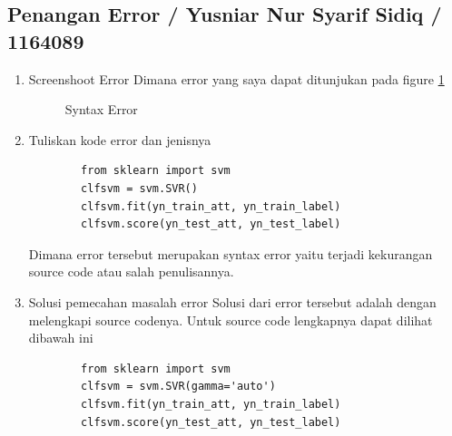 \subsection{Penangan Error / Yusniar Nur Syarif Sidiq / 1164089}
\begin{enumerate}

\item Screenshoot Error
Dimana error yang saya dapat ditunjukan pada figure \ref{YNC4-27}

	\begin{figure}[ht]
		\caption{Syntax Error}
		\label{YNC4-27}
	\end{figure}

\item Tuliskan kode error dan jenisnya

	\begin{verbatim}
		from sklearn import svm
		clfsvm = svm.SVR()
		clfsvm.fit(yn_train_att, yn_train_label)
		clfsvm.score(yn_test_att, yn_test_label)
	\end{verbatim}

Dimana error tersebut merupakan syntax error yaitu terjadi kekurangan source code atau salah penulisannya.

\item Solusi pemecahan masalah error
Solusi dari error tersebut adalah dengan melengkapi source codenya. Untuk source code lengkapnya dapat dilihat dibawah ini

	\begin{verbatim}
		from sklearn import svm
		clfsvm = svm.SVR(gamma='auto')
		clfsvm.fit(yn_train_att, yn_train_label)
		clfsvm.score(yn_test_att, yn_test_label)
	\end{verbatim}

\end{enumerate}